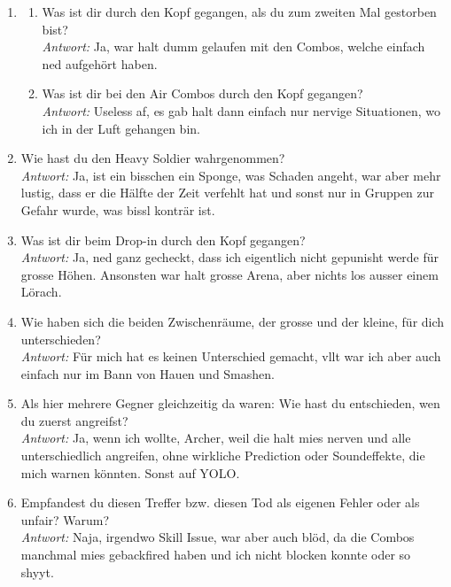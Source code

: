 \documentclass[../Main.tex]{subfiles}
\begin{document}
\begin{enumerate}[label=\textbf{I\arabic*}, leftmargin=1.5cm, itemsep=1em]
\item
\begin{enumerate}[label=\alph*), itemsep=0.6em]
\item Was ist dir durch den Kopf gegangen, als du zum zweiten Mal gestorben bist? \\
\textit{Antwort:} Ja, war halt dumm gelaufen mit den Combos, welche einfach ned aufgehört haben.
\item Was ist dir bei den Air Combos durch den Kopf gegangen? \\
\textit{Antwort:} Useless af, es gab halt dann einfach nur nervige Situationen, wo ich in der Luft gehangen bin.
\end{enumerate}

\item Wie hast du den Heavy Soldier wahrgenommen? \\
\textit{Antwort:} Ja, ist ein bisschen ein Sponge, was Schaden angeht, war aber mehr lustig, dass er die Hälfte der Zeit verfehlt hat und sonst nur in Gruppen zur Gefahr wurde, was bissl konträr ist.

\item Was ist dir beim Drop-in durch den Kopf gegangen? \\
\textit{Antwort:} Ja, ned ganz gecheckt, dass ich eigentlich nicht gepunisht werde für grosse Höhen. Ansonsten war halt grosse Arena, aber nichts los ausser einem Lörach.

\item Wie haben sich die beiden Zwischenräume, der grosse und der kleine, für dich unterschieden? \\
\textit{Antwort:} Für mich hat es keinen Unterschied gemacht, vllt war ich aber auch einfach nur im Bann von Hauen und Smashen.

\item Als hier mehrere Gegner gleichzeitig da waren: Wie hast du entschieden, wen du zuerst angreifst? \\
\textit{Antwort:} Ja, wenn ich wollte, Archer, weil die halt mies nerven und alle unterschiedlich angreifen, ohne wirkliche Prediction oder Soundeffekte, die mich warnen könnten. Sonst auf YOLO.

\item Empfandest du diesen Treffer bzw. diesen Tod als eigenen Fehler oder als unfair? Warum? \\
\textit{Antwort:} Naja, irgendwo Skill Issue, war aber auch blöd, da die Combos manchmal mies gebackfired haben und ich nicht blocken konnte oder so shyyt.


\end{enumerate}
\end{document}

